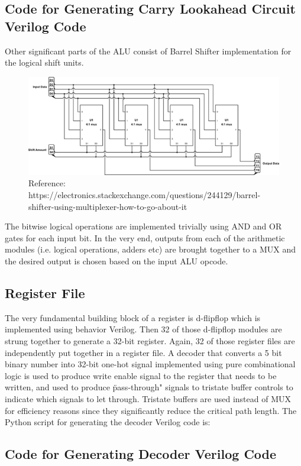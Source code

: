 \documentclass{article}
\begin{document}
		\subsection{Code for Generating Carry Lookahead Circuit Verilog Code}
		
		Other significant parts of the ALU consist of Barrel Shifter implementation for the logical shift units.
		\begin{figure}[h]
			\centering
			\includegraphics[width=5in]{barrel}
			\caption{Reference: https://electronics.stackexchange.com/questions/244129/barrel-shifter-using-multiplexer-how-to-go-about-it}
		\end{figure}
		The bitwise logical operations are implemented trivially using AND and OR gates for each input bit. In the very end, outputs from each of the arithmetic modules (i.e. logical operations, adders etc) are brought together to a MUX and the desired output is chosen based on the input ALU opcode.  
		\subsection{Register File}	
		The very fundamental building block of a register is d-flipflop which is implemented using behavior Verilog. Then 32 of those d-flipflop modules are strung together to generate a 32-bit register. Again, 32 of those register files are independently put together in a register file. A decoder that converts a 5 bit binary number into 32-bit one-hot signal implemented using pure combinational logic is used to produce write enable signal to the register that needs to be written, and used to produce \"pass-through" signals to tristate buffer controls to indicate which signals to let through. Tristate buffers are used instead of MUX for efficiency reasons since they significantly reduce the critical path length. 
		The Python script for generating the decoder Verilog code is:
		\subsection{Code for Generating Decoder Verilog Code}
		
\end{document}
